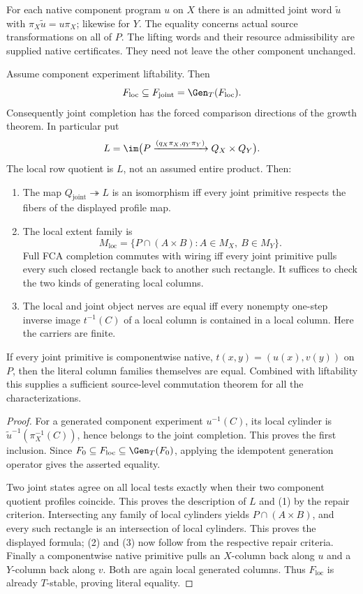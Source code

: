 \begin{definition}
For each native component program $u$ on $X$ there is an admitted
joint word $\widetilde u$ with
$\pi_X\widetilde u=u\pi_X$; likewise for $Y$.
The equality concerns actual source transformations on all of $P$.
The lifting words and their resource admissibility are supplied native
certificates. They need not leave the other component unchanged.
\end{definition}
\begin{theorem}
Assume component experiment liftability. Then
\[
 F_{\mathrm{loc}}\subseteq F_{\mathrm{joint}}
 =\Gen_T(F_{\mathrm{loc}}).
\]
Consequently joint completion has the forced comparison directions
of the growth theorem. In particular put
\[
 L=\im\bigl(P\xrightarrow{(q_X\pi_X,q_Y\pi_Y)}Q_X\times Q_Y\bigr).
\]
The local row quotient is $L$, not an assumed entire product. Then:
\begin{enumerate}
\item The map $Q_{\mathrm{joint}}\twoheadrightarrow L$ is an
isomorphism iff every joint primitive respects the fibers of the
displayed profile map.
\item The local extent family is
\[
 M_{\mathrm{loc}}=
 \{P\cap(A\times B):A\in M_X,\ B\in M_Y\}.
\]
Full FCA completion commutes with wiring iff every joint primitive
pulls every such closed rectangle back to another such rectangle.
It suffices to check the two kinds of generating local columns.
\item The local and joint object nerves are equal iff every nonempty
one-step inverse image $t^{-1}(C)$ of a local column is contained in
a local column. Here the carriers are finite.
\end{enumerate}
If every joint primitive is componentwise native,
$t(x,y)=(u(x),v(y))$ on $P$, then the literal column families themselves
are equal. Combined with liftability this supplies a sufficient
source-level commutation theorem for all the characterizations.
\end{theorem}
\begin{proof}
For a generated component experiment $u^{-1}(C)$, its local cylinder
is $\widetilde u^{-1}(\pi_X^{-1}(C))$, hence belongs to the joint
completion. This proves the first inclusion. Since
$F_0\subseteq F_{\mathrm{loc}}\subseteq\Gen_T(F_0)$, applying the
idempotent generation operator gives the asserted equality.

Two joint states agree on all local tests exactly when their two
component quotient profiles coincide. This proves the description of
$L$ and (1) by the repair criterion. Intersecting any family of local
cylinders yields $P\cap(A\times B)$, and every such rectangle is an
intersection of local cylinders. This proves the displayed formula;
(2) and (3) now follow from the respective repair criteria. Finally a
componentwise native primitive pulls an $X$-column back along $u$ and
a $Y$-column back along $v$. Both are again local generated columns.
Thus $F_{\mathrm{loc}}$ is already $T$-stable, proving literal equality.
\end{proof}
